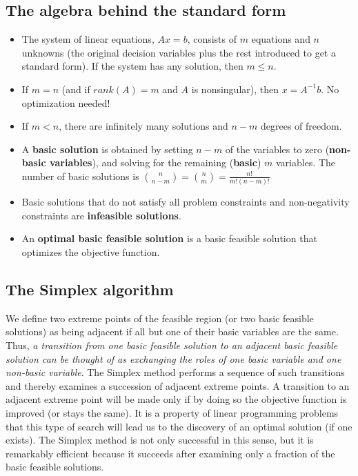 \documentclass[c]{beamer}
\begin{document}
\subsection{The algebra behind the standard form}

\begin{frame}
  \begin{itemize}
 \item The system of linear equations, $Ax = b$, consists of $m$ equations and $n$
unknowns (the original decision variables plus the rest introduced to get a standard form). If the system has any solution, then $m \leq n$.
\item If $m = n$ (and if $rank (A) = m$ and $A$ is nonsingular), then 
$x = A^{-1}b$. No optimization needed!
\item If $m < n$, there are infinitely many solutions and $n -m$ degrees of freedom. 
\item A {\bf basic solution} is obtained by setting $n - m$ of the variables to zero ({\bf non-basic variables}), and solving for the remaining ({\bf basic}) $m$ variables. The number of basic solutions is $\binom{n}{n-m}=\binom{n}{m}=\frac{n!}{m!(n-m)!}$
\item Basic solutions that do not satisfy all problem constraints and non-negativity constraints are {\bf infeasible solutions}.
\item An {\bf optimal basic feasible solution} is a
basic feasible solution that optimizes the objective function. 
\end{itemize}
\end{frame}

\subsection{The Simplex algorithm}

\begin{frame}
We define
two extreme points of the feasible region (or two basic feasible solutions) as being adjacent if all but one of their basic variables are the same. Thus, {\em a transition from one basic
feasible solution to an adjacent basic feasible solution can be thought of as exchanging
the roles of one basic variable and one non-basic variable}. The Simplex method performs a sequence of such transitions and thereby examines a succession of adjacent
extreme points. A transition to an adjacent extreme point will be made only if by doing
so the objective function is improved (or stays the same). It is a property of linear programming problems that this type of search will lead us to the discovery of an optimal
solution (if one exists). The Simplex method is not only successful in this sense, but it
is remarkably efficient because it succeeds after examining only a fraction of the basic
feasible solutions.\cite{carter}
\end{frame}
\end{document}
